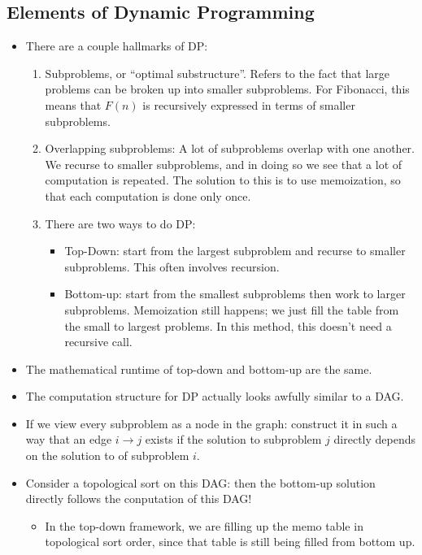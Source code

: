 	\subsection{Elements of Dynamic Programming}
	\begin{itemize}
		\item There are a couple hallmarks of DP:
			\begin{enumerate}
				\item Subproblems, or ``optimal substructure''. Refers to the fact that large problems 
					can be broken up into smaller subproblems. For Fibonacci, this means that 
					$F(n)$ is recursively expressed in terms of smaller subproblems.
				\item Overlapping subproblems: A lot of subproblems overlap with one another. We recurse to 
					smaller subproblems, and in doing so we see that a lot of computation 
					is repeated. The solution to this is to use memoization, so that 
					each computation is done only once.
		\item There are two ways to do DP:
			\begin{itemize}
				\item Top-Down: start from the largest subproblem and recurse to smaller subproblems. 
					This often involves recursion.    
				\item Bottom-up: start from the smallest subproblems then work to larger subproblems.
					Memoization still happens; we just fill the table from the small to 
					largest problems. In this method, this doesn't need a recursive call. 
			\end{itemize}
		\end{enumerate}
		\item The mathematical runtime of top-down and bottom-up are the same.
		\item The computation structure for DP actually looks awfully similar to a DAG. 
		\item If we view every subproblem as a node in the graph: construct it in such a way that 
			an edge $i \to j$ exists if the solution to subproblem $j$ directly depends on the solution to of 
			subproblem $i$. 
		\item Consider a topological sort on this DAG: then the bottom-up solution directly follows the 
			conputation of this DAG! 
			\begin{itemize}
				\item In the top-down framework, we are filling up the memo table in topological sort order, 
					since that table is still being filled from bottom up.
			\end{itemize}
	\end{itemize}
